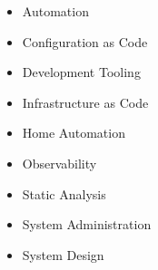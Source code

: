\begin{itemize}
  \item Automation
  \item Configuration as Code
  \item Development Tooling
  \item Infrastructure as Code
  \item Home Automation
  \item Observability
  \item Static Analysis
  \item System Administration
  \item System Design
\end{itemize}
